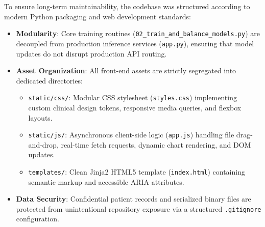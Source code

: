 To ensure long-term maintainability, the codebase was structured according to modern Python packaging and web development standards:
\begin{itemize}
    \item \textbf{Modularity}: Core training routines (\texttt{02\_train\_\allowbreak and\_\allowbreak balance\_\allowbreak models.py}) are decoupled from production inference services (\texttt{app.py}), ensuring that model updates do not disrupt production API routing.
    \item \textbf{Asset Organization}: All front-end assets are strictly segregated into dedicated directories:
    \begin{itemize}
        \item \texttt{static/css/}: Modular CSS stylesheet (\texttt{styles.css}) implementing custom clinical design tokens, responsive media queries, and flexbox layouts.
        \item \texttt{static/js/}: Asynchronous client-side logic (\texttt{app.js}) handling file drag-and-drop, real-time fetch requests, dynamic chart rendering, and DOM updates.
        \item \texttt{templates/}: Clean Jinja2 HTML5 template (\texttt{index.html}) containing semantic markup and accessible ARIA attributes.
    \end{itemize}
    \item \textbf{Data Security}: Confidential patient records and serialized binary files are protected from unintentional repository exposure via a structured \texttt{.gitignore} configuration.
\end{itemize}

